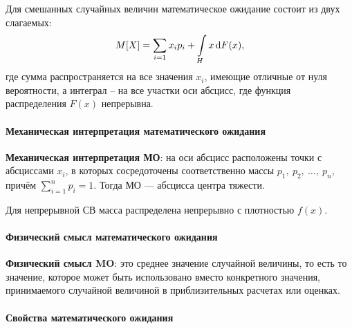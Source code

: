 \documentclass[a4paper]{article}
\newcommand{\key}[1]{{\color{Medium}\bfseries #1}}
\begin{document}
                Для смешанных случайных величин математическое ожидание состоит из двух слагаемых:
                \begin{equation*}
                    M[X] = \sum\limits_{i = 1} x_i p_i + \int\limits_{H} x \dif F(x) ,
                \end{equation*}
                где сумма распространяется на все значения $x_i$, имеющие отличные от нуля вероятности, а интеграл -- на все участки оси абсцисс, где функция распределения $F(x)$ непрерывна.

                \paragraph{Механическая интерпретация математического ожидания}

                    \key{Механическая интерпретация МО}: \newline
                    на оси абсцисс расположены точки с абсциссами $x_i$, в которых сосредоточены соответственно массы $p_1 , \: p_2 , \: \ldots , \: p_n$, причём $\sum\limits_{i = 1}^{n} p_i = 1$. Тогда МО --- абсцисса центра тяжести.
                    
                    Для непрерывной СВ масса распределена непрерывно с плотностью $f(x)$.

                \paragraph{Физический смысл математического ожидания}

                    \key{Физический смысл MO}: \newline
                    это среднее значение случайной величины, то есть то значение, которое может быть использовано вместо конкретного значения, принимаемого случайной величиной в приблизительных расчетах или оценках.

                \paragraph{Свойства математического ожидания}
\end{document}
